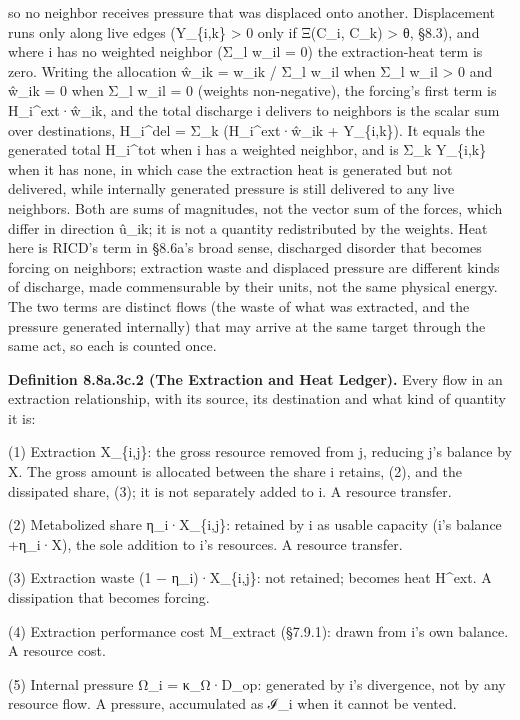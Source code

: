 \documentclass[
]{article}
\begin{document}
so no neighbor receives pressure that was displaced onto another.
Displacement runs only along live edges (Y\_\{i,k\} \textgreater{} 0
only if Ξ(C\_i, C\_k) \textgreater{} θ, §8.3), and where i has no
weighted neighbor (Σ\_l w\_il = 0) the extraction-heat term is zero.
Writing the allocation ŵ\_ik = w\_ik / Σ\_l w\_il when Σ\_l w\_il
\textgreater{} 0 and ŵ\_ik = 0 when Σ\_l w\_il = 0 (weights
non-negative), the forcing's first term is H\_i\^{}ext·ŵ\_ik, and the
total discharge i delivers to neighbors is the scalar sum over
destinations, H\_i\^{}del = Σ\_k (H\_i\^{}ext·ŵ\_ik + Y\_\{i,k\}). It
equals the generated total H\_i\^{}tot when i has a weighted neighbor,
and is Σ\_k Y\_\{i,k\} when it has none, in which case the extraction
heat is generated but not delivered, while internally generated pressure
is still delivered to any live neighbors. Both are sums of magnitudes,
not the vector sum of the forces, which differ in direction û\_ik; it is
not a quantity redistributed by the weights.
\textquotesingle Heat\textquotesingle{} here is RICD's term in §8.6a's
broad sense, discharged disorder that becomes forcing on neighbors;
extraction waste and displaced pressure are different kinds of
discharge, made commensurable by their units, not the same physical
energy. The two terms are distinct flows (the waste of what was
extracted, and the pressure generated internally) that may arrive at the
same target through the same act, so each is counted once.

\textbf{Definition 8.8a.3c.2 (The Extraction and Heat Ledger).} Every
flow in an extraction relationship, with its source, its destination and
what kind of quantity it is:

(1) Extraction X\_\{i,j\}: the gross resource removed from j, reducing
j's balance by X. The gross amount is allocated between the share i
retains, (2), and the dissipated share, (3); it is not separately added
to i. A resource transfer.

(2) Metabolized share η\_i·X\_\{i,j\}: retained by i as usable capacity
(i's balance +η\_i·X), the sole addition to i's resources. A resource
transfer.

(3) Extraction waste (1 − η\_i)·X\_\{i,j\}: not retained; becomes heat
H\^{}ext. A dissipation that becomes forcing.

(4) Extraction performance cost M\_extract (§7.9.1): drawn from i's own
balance. A resource cost.

(5) Internal pressure Ω\_i = κ\_Ω·D\_op: generated by i's divergence,
not by any resource flow. A pressure, accumulated as ℐ\_i when it cannot
be vented.
\end{document}
